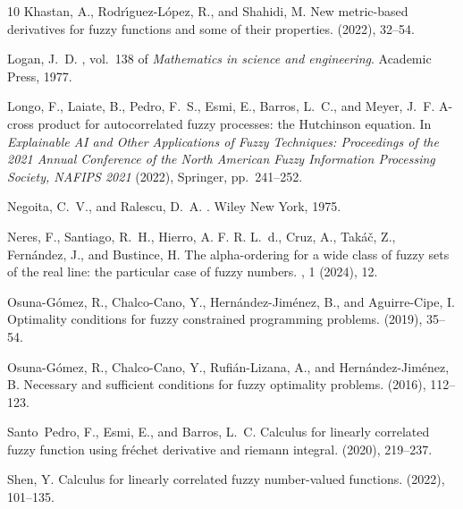 \documentclass[12pt,a4paper]{article}
\begin{document}
\begin{thebibliography}{10}
{\sc Khastan, A., Rodr{\'\i}guez-L{\'o}pez, R., and Shahidi, M.}
\newblock New metric-based derivatives for fuzzy functions and some of their properties.
 (2022), 32--54.

{\sc Logan, J.~D.}
, vol.~138 of {\em Mathematics in science and engineering}.
\newblock Academic Press, 1977.

{\sc Longo, F., Laiate, B., Pedro, F.~S., Esmi, E., Barros, L.~C., and Meyer, J.~F.}
\newblock A-cross product for autocorrelated fuzzy processes: the {H}utchinson equation.
\newblock In {\em Explainable AI and Other Applications of Fuzzy Techniques: Proceedings of the 2021 Annual Conference of the North American Fuzzy Information Processing Society, NAFIPS 2021\/} (2022), Springer, pp.~241--252.

{\sc Negoita, C.~V., and Ralescu, D.~A.}
.
\newblock Wiley New York, 1975.

{\sc Neres, F., Santiago, R.~H., Hierro, A. F. R. L.~d., Cruz, A., Tak{\'a}{\v{c}}, Z., Fern{\'a}ndez, J., and Bustince, H.}
\newblock The alpha-ordering for a wide class of fuzzy sets of the real line: the particular case of fuzzy numbers.
, 1 (2024), 12.

{\sc Osuna-G{\'o}mez, R., Chalco-Cano, Y., Hern{\'a}ndez-Jim{\'e}nez, B., and Aguirre-Cipe, I.}
\newblock Optimality conditions for fuzzy constrained programming problems.
 (2019), 35--54.

{\sc Osuna-G{\'o}mez, R., Chalco-Cano, Y., Rufi{\'a}n-Lizana, A., and Hern{\'a}ndez-Jim{\'e}nez, B.}
\newblock Necessary and sufficient conditions for fuzzy optimality problems.
 (2016), 112--123.

{\sc Santo~Pedro, F., Esmi, E., and Barros, L.~C.}
\newblock Calculus for linearly correlated fuzzy function using fr{\'e}chet derivative and riemann integral.
 (2020), 219--237.

{\sc Shen, Y.}
\newblock Calculus for linearly correlated fuzzy number-valued functions.
 (2022), 101--135.


\end{thebibliography}
\end{document}
